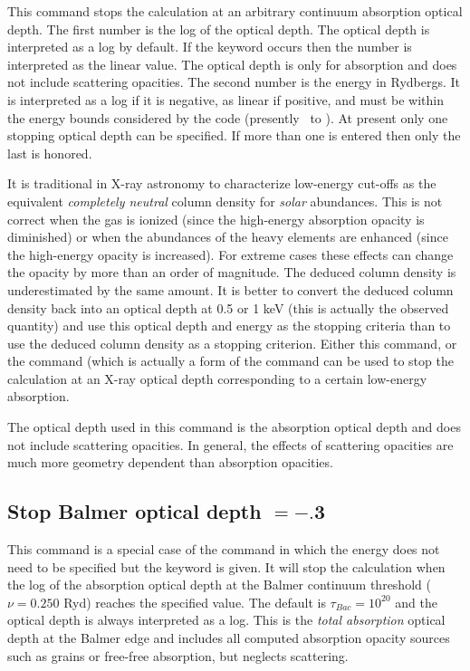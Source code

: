 This command stops the calculation at an arbitrary continuum absorption
optical depth.
The first number is the log of the optical depth.
The optical depth is interpreted as a log by default.
If the  keyword
occurs then the number is interpreted as the linear value.
The optical
depth is only for absorption and does not include scattering opacities.
The second number is the energy in Rydbergs.
It is interpreted as a log
if it is negative, as linear if positive, and must be within the energy
bounds considered by the code (presently \emm\ to
\egamry).
At present only one stopping optical depth can be specified.
If more than
one is entered then only the last is honored.

It is traditional in X-ray astronomy to characterize low-energy cut-offs
as the equivalent \emph{completely neutral} column density
for \emph{solar} abundances.
This is not correct when the gas is ionized
(since the high-energy absorption
opacity is diminished) or when the abundances of the heavy elements are
enhanced (since the high-energy opacity is increased).
For extreme cases
these effects can change the opacity by more than an order of magnitude.
The deduced column density is underestimated by the same amount.
It is
better to convert the deduced column density back into an optical depth
at 0.5 or 1 keV (this is actually the observed quantity)
and use this optical
depth and energy as the stopping criteria than to use the deduced column
density as a stopping criterion.
Either this command, or the  command (which is actually a form of the
 command can be used to stop
the calculation
at an X-ray optical depth corresponding to a certain low-energy absorption.

The optical depth used in this command is the absorption optical depth
and does not include scattering opacities.
In general, the effects of
scattering opacities are much more geometry dependent than absorption
opacities.

\subsection{Stop Balmer optical depth $= -.$3}

This command is a special case of the 
command in which the energy does not need to be specified
but the keyword  is given.
It will stop the calculation when the log of the absorption
optical depth
at the Balmer continuum threshold ($\nu = 0.250$ Ryd)
reaches the specified value.
The default is $\tau_{Bac} = 10^{20}$ and the optical depth
is always interpreted as a log.
This is the \emph{total absorption} optical depth at the Balmer edge
and includes all computed absorption opacity sources such as grains or
free-free absorption, but neglects scattering.

